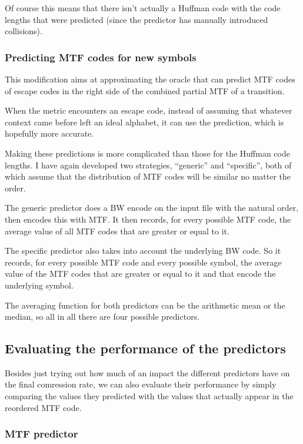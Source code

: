 \documentclass[a4paper]{scrreprt}
\begin{document}
Of course this means that there isn't actually a Huffman code with the code
lengths that were predicted (since the predictor has manually introduced
collisions).

\subsubsection{Predicting MTF codes for new symbols}

This modification aims at approximating the oracle that can predict MTF codes of
escape codes in the right side of the combined partial MTF of a transition.

When the metric encounters an escape code, instead of assuming that whatever
context came before left an ideal alphabet, it can use the prediction, which is
hopefully more accurate.

Making these predictions is more complicated than those for the Huffman code
lengths. I have again developed two strategies, ``generic'' and ``specific'',
both of which assume that the distribution of MTF codes will be similar no
matter the order.

The generic predictor does a BW encode on the input file with the natural order,
then encodes this with MTF. It then records, for every possible MTF code, the
average value of all MTF codes that are greater or equal to it.

The specific predictor also takes into account the underlying BW code. So it
records, for every possible MTF code and every possible symbol, the average
value of the MTF codes that are greater or equal to it and that encode the
underlying symbol.

The averaging function for both predictors can be the arithmetic mean or the
median, so all in all there are four possible predictors.

\subsection{Evaluating the performance of the predictors}

Besides just trying out how much of an impact the different predictors have on
the final comression rate, we can also evaluate their performance by simply
comparing the values they predicted with the values that actually appear in the
reordered MTF code.

\subsubsection{MTF predictor}
\end{document}
